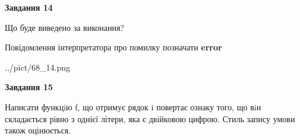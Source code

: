 \documentclass[11pt, ukrainian]{article}
\begin{document}
{\begin {large}
{\begin {center}\textbf{Завдання 14}\end {center}}\par
Що буде виведено за виконання? \par
Повідомлення інтерпретатора про помилку позначати \textbf{error}

\begin{center}
	{../pict/68_14.png}
\end{center}
\newpage

{\begin {center}\textbf{Завдання 15}\end {center}}\par

Написати функцiю f, що отримує рядок i повертає ознаку того, що вiн складається рівно з однієї літери, яка є двійковою цифрою. Стиль запису умови також оцінюється.\par
\newpage

\end {large}}
\end{document}
